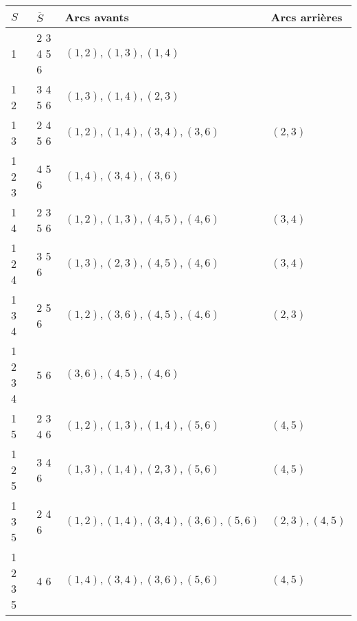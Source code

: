 \documentclass{article}
\begin{document}
\begin{tabular}{|l|l|l|l|}
  \hline
  $S$ & $\overline{S}$ & Arcs avants & Arcs arrières \\
  \hline
  \hline
  1 \phantom{2} \phantom{3} \phantom{4} \phantom{5} &          2           3           4           5  6 & ${(1,2), (1,3), (1,4)}$               & ${}$             \\
  1          2  \phantom{3} \phantom{4} \phantom{5} & \phantom{2}          3           4           5  6 & ${(1,3), (1,4), (2,3)}$               & ${}$             \\
  1 \phantom{2}          3  \phantom{4} \phantom{5} &          2  \phantom{3}          4           5  6 & ${(1,2), (1,4), (3,4), (3,6)}$        & ${(2,3)}$        \\
  1          2           3  \phantom{4} \phantom{5} & \phantom{2} \phantom{3}          4           5  6 & ${(1,4), (3,4), (3,6)}$               & ${}$             \\
  1 \phantom{2} \phantom{3}          4  \phantom{5} &          2           3  \phantom{4}          5  6 & ${(1,2), (1,3), (4,5), (4,6)}$        & ${(3,4)}$        \\
  1          2  \phantom{3}          4  \phantom{5} & \phantom{2}          3  \phantom{4}          5  6 & ${(1,3), (2,3), (4,5), (4,6)}$        & ${(3,4)}$        \\
  1 \phantom{2}          3           4  \phantom{5} &          2  \phantom{3} \phantom{4}          5  6 & ${(1,2), (3,6), (4,5), (4,6)}$        & ${(2,3)}$        \\
  1          2           3           4  \phantom{5} & \phantom{2} \phantom{3} \phantom{4}          5  6 & ${(3,6), (4,5), (4,6)}$               & ${}$             \\
  1 \phantom{2} \phantom{3} \phantom{4}          5  &          2           3           4  \phantom{5} 6 & ${(1,2), (1,3), (1,4), (5,6)}$        & ${(4,5)}$        \\
  1          2  \phantom{3} \phantom{4}          5  & \phantom{2}          3           4  \phantom{5} 6 & ${(1,3), (1,4), (2,3), (5,6)}$        & ${(4,5)}$        \\
  1 \phantom{2}          3  \phantom{4}          5  &          2  \phantom{3}          4  \phantom{5} 6 & ${(1,2), (1,4), (3,4), (3,6), (5,6)}$ & ${(2,3), (4,5)}$ \\
  1          2           3  \phantom{4}          5  & \phantom{2} \phantom{3}          4  \phantom{5} 6 & ${(1,4), (3,4), (3,6), (5,6)}$        & ${(4,5)}$        \\

\end{tabular}
\end{document}
